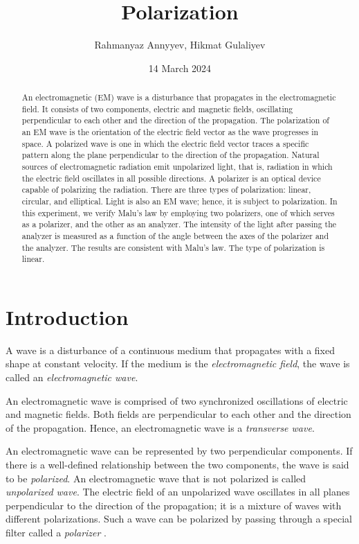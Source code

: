 \documentclass[10pt]{article}
\title{Polarization}
\author{Rahmanyaz Annyyev, Hikmat Gulaliyev}
\date{14 March 2024}
\begin{document}
\maketitle

\begin{abstract}

An electromagnetic (EM) wave is a disturbance that propagates in the electromagnetic field. It consists of two components, electric and magnetic fields, oscillating perpendicular to each other and the direction of the propagation. The polarization of an EM wave is the orientation of the electric field vector as the wave progresses in space. A polarized wave is one in which the electric field vector traces a specific pattern along the plane perpendicular to the direction of the propagation. Natural sources of electromagnetic radiation emit unpolarized light, that is, radiation in which the electric field oscillates in all possible directions. A polarizer is an optical device capable of polarizing the radiation. There are three types of polarization: linear, circular, and elliptical. Light is also an EM wave; hence, it is subject to polarization. In this experiment, we verify Malu's law by employing two polarizers, one of which serves as a polarizer, and the other as an analyzer. The intensity of the light after passing the analyzer is measured as a function of the angle between the axes of the polarizer and the analyzer. The results are consistent with Malu's law. The type of polarization is linear.

\end{abstract}

\section{Introduction}

A wave is a disturbance of a continuous medium that propagates with a fixed shape at constant velocity. If the medium is the \textit{electromagnetic field}, the wave is called an \textit{electromagnetic wave}. 

An electromagnetic wave is comprised of two synchronized oscillations of electric and magnetic fields. Both fields are perpendicular to each other and the direction of the propagation. Hence, an electromagnetic wave is a \textit{transverse wave}.

An electromagnetic wave can be represented by two perpendicular components. If there is a well-defined relationship between the two components, the wave is said to be \textit{polarized}. An electromagnetic wave that is not polarized is called \textit{unpolarized wave}. The electric field of an unpolarized wave oscillates in all planes perpendicular to the direction of the propagation; it is a mixture of waves with different polarizations. Such a wave can be polarized by passing through a special filter called a \textit{polarizer} \cite{Hecht_2017}.
\end{document}
